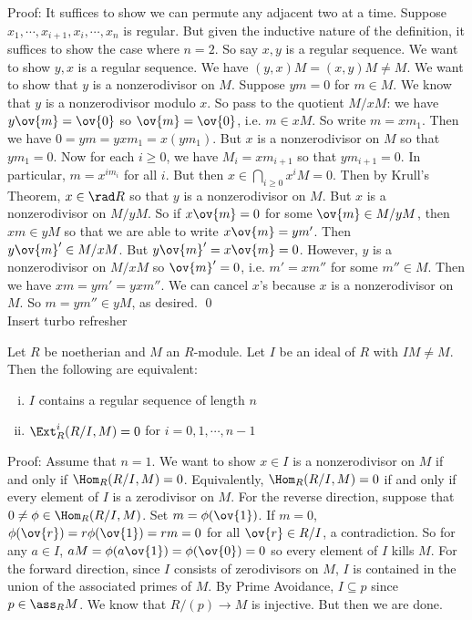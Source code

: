\noindent Proof: It suffices to show we can permute any adjacent two at a time. Suppose $x_1,\cdots,x_{i+1},x_i,\cdots,x_n$ is regular. But given the inductive nature of the definition, it suffices to show the case where $n=2$. So say $x,y$ is a regular sequence. We want to show $y,x$ is a regular sequence. We have $(y,x)M=(x,y)M \neq M$. We want to show that $y$ is a nonzerodivisor on $M$. Suppose $ym=0$ for $m \in M$. We know that $y$ is a nonzerodivisor modulo $x$. So pass to the quotient $M/xM$: we have $y \ov{m}=\ov{0}$ so $\ov{m}=\ov{0}$, i.e. $m \in xM$. So write $m=xm_1$. Then we have $0=ym=yxm_1=x(ym_1)$. But $x$ is a nonzerodivisor on $M$ so that $ym_1=0$. Now for each $i \geq 0$, we have $M_i=xm_{i+1}$ so that $ym_{i+1}=0$. In particular, $m=x^{im_i}$ for all $i$. But then $x \in \bigcap_{i \geq 0} x^iM=0$. Then by Krull's Theorem, $x \in \rad R$ so that $y$ is a nonzerodivisor on $M$. But $x$ is a nonzerodivisor on $M/yM$. So if $x \ov{m}=0$ for some $\ov{m} \in M/yM$, then $xm \in yM$ so that we are able to write $x\ov{m}=ym'$. Then $y \ov{m}' \in M/xM$. But $y\ov{m}'=x\ov{m}=0$. However, $y$ is a nonzerodivisor on $M/xM$ so $\ov{m}'=0$, i.e. $m'=xm''$ for some $m'' \in M$. Then we have $xm=ym'=yxm''$. We can cancel $x$'s because $x$ is a nonzerodivisor on $M$. So $m=ym'' \in yM$, as desired. \qed \\

\LARGE{ Insert turbo refresher}

\normalsize 

\begin{thmm}
Let $R$ be noetherian and $M$ an $R$-module. Let $I$ be an ideal of $R$ with $IM \neq M$. Then the following are equivalent:
\begin{enumerate}[(i)]
\item $I$ contains a regular sequence of length $n$
\item $\Ext^i_R(R/I,M)=0$ for $i=0,1,\cdots,n-1$ 
\end{enumerate}
\end{thmm}

\noindent Proof: Assume that $n=1$. We want to show $x \in I$ is a nonzerodivisor on $M$ if and only if $\Hom_R(R/I,M)=0$. Equivalently, $\Hom_R(R/I,M)=0$ if and only if every element of $I$ is a zerodivisor on $M$. For the reverse direction, suppose that $0\neq \phi \in \Hom_R(R/I,M)$. Set $m=\phi(\ov{1})$. If $m=0$, $\phi(\ov{r})=r\phi(\ov{1})=rm=0$ for all $\ov{r} \in R/I$, a contradiction. So for any $a \in I$, $aM=\phi(a\ov{1})=\phi(\ov{0})=0$ so every element of $I$ kills $M$. For the forward direction, since $I$ consists of zerodivisors on $M$, $I$ is contained in the union of the associated primes of $M$. By Prime Avoidance, $I \subseteq p$ since $p \in \ass_R M$. We know that $R/(p) \to M$ is injective. But then we are done. 

